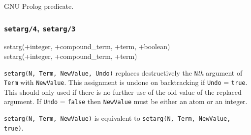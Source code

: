 GNU Prolog predicate.

\subsubsection{\texttt{setarg/4},
               \texttt{setarg/3}}

\begin{TemplatesOneCol}
setarg(+integer, +compound\_term, +term, +boolean)\\
setarg(+integer, +compound\_term, +term)

\end{TemplatesOneCol}

\Description

\texttt{setarg(N, Term, NewValue, Undo)} replaces destructively the
\texttt{N}\emph{th} argument of \texttt{Term} with \texttt{NewValue}. This
assignment is undone on backtracking if \texttt{Undo} = \texttt{true}. This
should only used if there is no further use of the old value of the replaced
argument. If \texttt{Undo} = \texttt{false} then \texttt{NewValue} must be
either an atom or an integer.

\texttt{setarg(N, Term, NewValue)} is equivalent to \texttt{setarg(N, Term,
NewValue, true)}.

\begin{PlErrors}









\end{PlErrors}

\Portability

